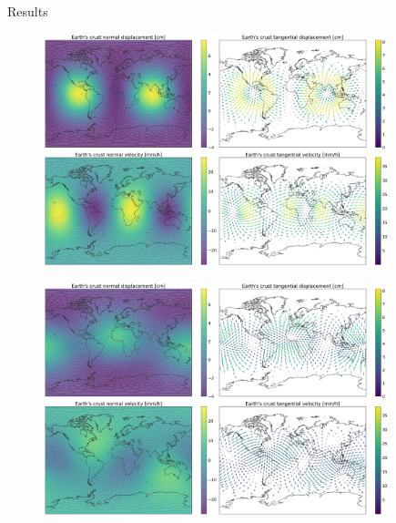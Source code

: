 \documentclass[final]{beamer}
\newlength{\onecolwid}
\begin{document}
\begin{frame}[t]
\begin{columns}[t]
\begin{column}{\onecolwid}
\begin{block}{Results}
\vspace*{.4em}
\begin{figure}
  \begin{center}
    \includegraphics[width=0.94\textwidth]{images/viscoelastic001.png}
  \end{center}
\end{figure}
\vspace*{.4em}
\begin{figure}
  \begin{center}
    \includegraphics[width=0.94\textwidth]{images/viscoelastic169.png}
  \end{center}
\end{figure}
\end{block}

\end{column} %


\begin{column}{\onecolwid} %


\end{column}
\end{columns}
\end{frame}
\end{document}
